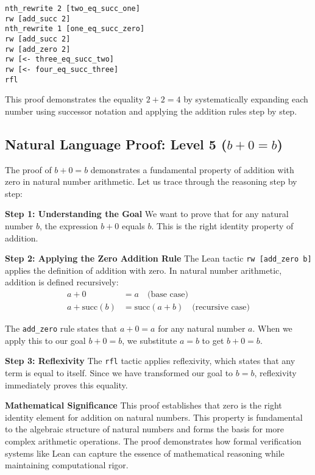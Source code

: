 \documentclass{article}
\theoremstyle{plain}
\theoremstyle{definition}
\theoremstyle{remark}
\begin{document}
\begin{verbatim}
nth_rewrite 2 [two_eq_succ_one]
rw [add_succ 2]
nth_rewrite 1 [one_eq_succ_zero]
rw [add_succ 2]
rw [add_zero 2]
rw [<- three_eq_succ_two]
rw [<- four_eq_succ_three]
rfl
\end{verbatim}

This proof demonstrates the equality $2 + 2 = 4$ by systematically expanding each number using successor notation and applying the addition rules step by step.

\subsection{Natural Language Proof: Level 5 ($b + 0 = b$)}

The proof of $b + 0 = b$ demonstrates a fundamental property of addition with zero in natural number arithmetic. Let us trace through the reasoning step by step:

\textbf{Step 1: Understanding the Goal}
We want to prove that for any natural number $b$, the expression $b + 0$ equals $b$. This is the right identity property of addition.

\textbf{Step 2: Applying the Zero Addition Rule}
The Lean tactic \texttt{rw [add\_zero b]} applies the definition of addition with zero. In natural number arithmetic, addition is defined recursively:
\begin{align}
a + 0 &= a \quad \text{(base case)} \\
a + \text{succ}(b) &= \text{succ}(a + b) \quad \text{(recursive case)}
\end{align}

The \texttt{add\_zero} rule states that $a + 0 = a$ for any natural number $a$. When we apply this to our goal $b + 0 = b$, we substitute $a = b$ to get $b + 0 = b$.

\textbf{Step 3: Reflexivity}
The \texttt{rfl} tactic applies reflexivity, which states that any term is equal to itself. Since we have transformed our goal to $b = b$, reflexivity immediately proves this equality.

\textbf{Mathematical Significance}
This proof establishes that zero is the right identity element for addition on natural numbers. This property is fundamental to the algebraic structure of natural numbers and forms the basis for more complex arithmetic operations. The proof demonstrates how formal verification systems like Lean can capture the essence of mathematical reasoning while maintaining computational rigor.
\end{document}
